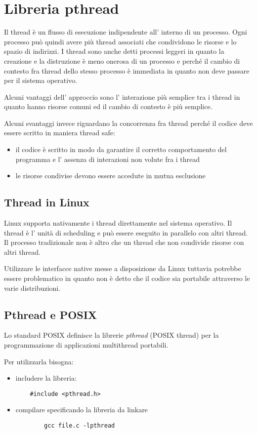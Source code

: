 \section{Libreria pthread}
Il thread è un flusso di esecuzione indipendente all' interno di un processo.
Ogni processo può quindi avere più thread associati che condividono le risorse e lo spazio di indirizzi.
I thread sono anche detti processi leggeri in quanto la creazione e la distruzione è meno onerosa di un processo e perché il cambio di contesto fra thread dello stesso processo è immediata in quanto non deve passare per il sistema operativo.

Alcuni vantaggi dell' approccio sono l' interazione più semplice tra i thread in quanto hanno risorse comuni ed il cambio di contesto è più semplice.

Alcuni svantaggi invece riguardano la concorrenza fra thread perché il codice deve essere scritto in maniera thread safe:
\begin{itemize}
    \item il codice è scritto in modo da garantire il corretto comportamento del programma e l' assenza di interazioni non volute fra i thread
    \item le risorse condivise devono essere accedute in mutua esclusione
\end{itemize}

\subsection{Thread in Linux}
Linux supporta nativamente i thread direttamente nel sistema operativo.
Il thread è l' unità di scheduling e può essere eseguito in parallelo con altri thread.
Il processo tradizionale non è altro che un thread che non condivide risorse con altri thread.

Utilizzare le interfacce native messe a disposizione da Linux tuttavia potrebbe essere problematico in quanto non è detto che il codice sia portabile attraverso le varie distribuzioni.

\subsection{Pthread e POSIX}
Lo standard POSIX definisce la librerie \emph{pthread} (POSIX thread) per la programmazione di applicazioni multithread portabili.

Per utilizzarla bisogna:
\begin{itemize}
    \item includere la libreria:
    \begin{verbatim}
    #include <pthread.h>
    \end{verbatim}
    
    \item compilare specificando la libreria da linkare
    \begin{verbatim}
        gcc file.c -lpthread
    \end{verbatim}
\end{itemize}

